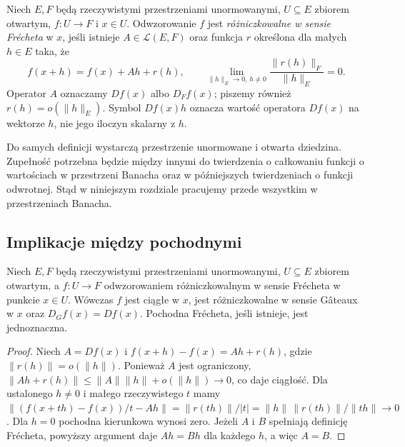 \begin{definicja}
\label{def:frechet14}
Niech $E,F$ będą rzeczywistymi przestrzeniami unormowanymi,
$U\subseteq E$ zbiorem otwartym, $f:U\to F$ i $x\in U$.
Odwzorowanie $f$ jest \emph{różniczkowalne w sensie Frécheta} w $x$, jeśli istnieje $A\in\mathcal L(E,F)$ oraz funkcja $r$ określona dla małych $h\in E$ taka, że
\[
f(x+h)=f(x)+Ah+r(h),\qquad
\lim_{\|h\|_E\to0,\,h\ne0}\frac{\|r(h)\|_F}{\|h\|_E}=0.
\]
Operator $A$ oznaczamy $Df(x)$ albo $D_Ff(x)$; piszemy również $r(h)=o(\|h\|_E)$. Symbol $Df(x)h$ oznacza wartość operatora $Df(x)$ na wektorze $h$, nie jego iloczyn skalarny z $h$.
\end{definicja}

\begin{uwaga}
\label{rem:completeness14}
Do samych definicji wystarczą przestrzenie unormowane i otwarta dziedzina. Zupełność potrzebna będzie między innymi do twierdzenia o całkowaniu funkcji o wartościach w przestrzeni Banacha oraz w późniejszych twierdzeniach o funkcji odwrotnej. Stąd w niniejszym rozdziale pracujemy przede wszystkim w przestrzeniach Banacha.
\end{uwaga}

\subsection{Implikacje między pochodnymi}

\begin{twierdzenie}
\label{thm:frechet-implies-gateaux14}
Niech $E,F$ będą rzeczywistymi przestrzeniami unormowanymi, $U\subseteq E$ zbiorem otwartym, a $f:U\to F$ odwzorowaniem różniczkowalnym w sensie Frécheta w punkcie $x\in U$. Wówczas $f$ jest ciągłe w $x$, jest różniczkowalne w sensie Gâteaux w $x$ oraz $D_Gf(x)=Df(x)$. Pochodna Frécheta, jeśli istnieje, jest jednoznaczna.
\end{twierdzenie}
\begin{proof}
Niech $A=Df(x)$ i $f(x+h)-f(x)=Ah+r(h)$, gdzie $\|r(h)\|=o(\|h\|)$. Ponieważ $A$ jest ograniczony, $\|Ah+r(h)\|\le\|A\|\|h\|+o(\|h\|)\to0$, co daje ciągłość. Dla ustalonego $h\ne0$ i małego rzeczywistego $t$ mamy
$\|(f(x+th)-f(x))/t-Ah\|=\|r(th)\|/|t|=\|h\|\,\|r(th)\|/\|th\|\to0$.
Dla $h=0$ pochodna kierunkowa wynosi zero. Jeżeli $A$ i $B$ spełniają definicję Frécheta, powyższy argument daje $Ah=Bh$ dla każdego $h$, a więc $A=B$.
\end{proof}

